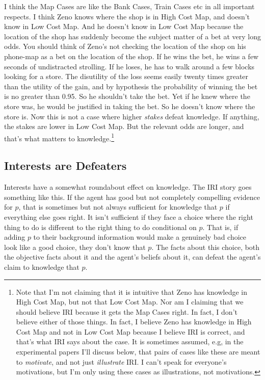\documentclass[11pt,oneside]{book}
\begin{document}
\noindent I think the Map Cases are like the Bank Cases, Train Cases etc in all important respects. I think Zeno knows where the shop is in High Cost Map, and doesn't know in Low Cost Map. And he doesn't know in Low Cost Map because the location of the shop has suddenly become the subject matter of a bet at very long odds. You should think of Zeno's not checking the location of the shop on his phone-map as a bet on the location of the shop. If he wins the bet, he wins a few seconds of undistracted strolling. If he loses, he has to walk around a few blocks looking for a store. The disutility of the loss seems easily twenty times greater than the utility of the gain, and by hypothesis the probability of winning the bet is no greater than 0.95. So he shouldn't take the bet. Yet  if he knew where the store was, he would be justified in taking the bet. So he doesn't know where the store is. Now this is not a case where higher \textit{stakes} defeat knowledge. If anything, the stakes are lower in Low Cost Map. But the relevant odds are longer, and that's what matters to knowledge.\footnote{Note that I'm not claiming that it is intuitive that Zeno has knowledge in High Cost Map, but not that Low Cost Map. Nor am I claiming that we should believe IRI because it gets the Map Cases right. In fact, I don't believe either of those things. In fact, I believe Zeno has knowledge in High Cost Map and not in Low Cost Map because I believe IRI is correct, and that's what IRI says about the case. It is sometimes assumed, e.g, in the experimental papers I'll discuss below, that pairs of cases like these are meant to \textit{motivate}, and not just \textit{illustrate} IRI. I can't speak for everyone's motivations, but I'm only using these cases as illustrations, not motivations.}

\subsection{Interests are Defeaters}

Interests have a somewhat roundabout effect on knowledge. The IRI story goes something like this. If the agent has good but not completely compelling evidence for $p$, that is sometimes but not always sufficient for knowledge that $p$ if everything else goes right. It isn't sufficient if they face a choice where the right thing to do is different to the right thing to do conditional on $p$. That is, if adding $p$ to their background information would make a genuinely bad choice look like a good choice, they don't know that $p$. The facts about this choice, both the objective facts about it and the agent's beliefs about it, can defeat the agent's claim to knowledge that $p$.
\end{document}
